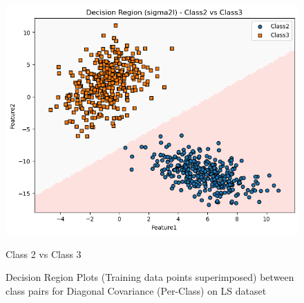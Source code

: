 \begin{figure}[H]
\begin{minipage}{0.32\linewidth}
        \includegraphics[width=\linewidth]{images/LS_Group04_images/01_sigma2i/04_decision_region_c2_c3.png}
        \caption*{Class 2 vs Class 3}
    \end{minipage}
    \caption{Decision Region Plots (Training data points superimposed) between class pairs for Diagonal Covariance (Per-Class) on LS dataset}
\end{figure}